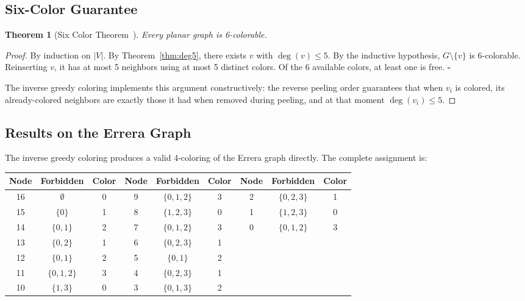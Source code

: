 \documentclass[12pt,letterpaper]{article}
\theoremstyle{plain}
\newtheorem{theorem}{Theorem}[section]
\theoremstyle{definition}
\theoremstyle{remark}
\newcommand{\degr}{\operatorname{deg}}
\begin{document}
\subsection{Six-Color Guarantee}

\begin{theorem}[Six Color Theorem~\cite{heawood1890}]
Every planar graph is 6-colorable.
\end{theorem}

\begin{proof}
By induction on $|V|$. By Theorem~\ref{thm:deg5}, there exists $v$ with
$\degr(v) \leq 5$. By the inductive hypothesis, $G \setminus \{v\}$ is
6-colorable. Reinserting $v$, it has at most 5 neighbors using at most 5
distinct colors. Of the 6 available colors, at least one is free. $\square$

The inverse greedy coloring implements this argument constructively: the reverse
peeling order guarantees that when $v_i$ is colored, its already-colored
neighbors are exactly those it had when removed during peeling, and at that
moment $\degr(v_i) \leq 5$.
\end{proof}

\subsection{Results on the Errera Graph}

The inverse greedy coloring produces a valid 4-coloring of the Errera graph
directly. The complete assignment is:

\begin{center}
\begin{tabular}{ccc|ccc|ccc}
\toprule
\textbf{Node} & \textbf{Forbidden} & \textbf{Color} &
\textbf{Node} & \textbf{Forbidden} & \textbf{Color} &
\textbf{Node} & \textbf{Forbidden} & \textbf{Color} \\
\midrule
16 & $\emptyset$      & 0 &  9 & $\{0,1,2\}$ & 3 &  2 & $\{0,2,3\}$ & 1 \\
15 & $\{0\}$          & 1 &  8 & $\{1,2,3\}$ & 0 &  1 & $\{1,2,3\}$ & 0 \\
14 & $\{0,1\}$        & 2 &  7 & $\{0,1,2\}$ & 3 &  0 & $\{0,1,2\}$ & 3 \\
13 & $\{0,2\}$        & 1 &  6 & $\{0,2,3\}$ & 1 &    &             &   \\
12 & $\{0,1\}$        & 2 &  5 & $\{0,1\}$   & 2 &    &             &   \\
11 & $\{0,1,2\}$      & 3 &  4 & $\{0,2,3\}$ & 1 &    &             &   \\
10 & $\{1,3\}$        & 0 &  3 & $\{0,1,3\}$ & 2 &    &             &   \\
\bottomrule
\end{tabular}
\end{center}
\end{document}
